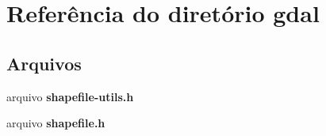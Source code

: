 \section{Referência do diretório gdal}
\label{dir_8a5d3a59b602d75f26cec70c82f9f985}
\subsection*{Arquivos}
\begin{DoxyCompactItemize}
\item 
arquivo {\bf shapefile-\/utils.\+h}
\item 
arquivo {\bf shapefile.\+h}
\end{DoxyCompactItemize}
